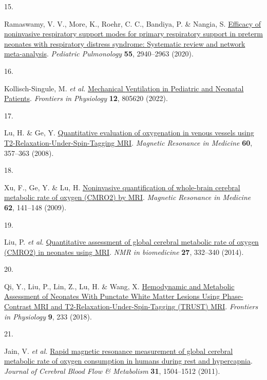 \documentclass[
  letterpaper,
  DIV=11,
  numbers=noendperiod]{scrartcl}
\newlength{\cslhangindent}
\newlength{\csllabelwidth}
\newenvironment{CSLReferences}[2] %
 {\begin{list}{}{%
  \setlength{\itemindent}{0pt}
  \setlength{\leftmargin}{0pt}
  \setlength{\parsep}{0pt}
  \ifodd #1
   \setlength{\leftmargin}{\cslhangindent}
   \setlength{\itemindent}{-1\cslhangindent}
  \fi
  \setlength{\itemsep}{#2\baselineskip}}}
 {\end{list}}
\newcommand{\CSLLeftMargin}[1]{\parbox[t]{\csllabelwidth}{\strut#1\strut}}
\newcommand{\CSLRightInline}[1]{\parbox[t]{\linewidth - \csllabelwidth}{\strut#1\strut}}
\begin{document}
\begin{CSLReferences}{0}{0}
\CSLLeftMargin{15. }%
\CSLRightInline{Ramaswamy, V. V., More, K., Roehr, C. C., Bandiya, P. \&
Nangia, S. \href{https://doi.org/10.1002/ppul.25011}{Efficacy of
noninvasive respiratory support modes for primary respiratory support in
preterm neonates with respiratory distress syndrome: {Systematic} review
and network meta-analysis}. \emph{Pediatric Pulmonology} \textbf{55},
2940--2963 (2020).}

\CSLLeftMargin{16. }%
\CSLRightInline{Kollisch-Singule, M. \emph{et al.}
\href{https://doi.org/10.3389/fphys.2021.805620}{Mechanical
{Ventilation} in {Pediatric} and {Neonatal Patients}}. \emph{Frontiers
in Physiology} \textbf{12}, 805620 (2022).}

\CSLLeftMargin{17. }%
\CSLRightInline{Lu, H. \& Ge, Y.
\href{https://doi.org/10.1002/mrm.21627}{Quantitative evaluation of
oxygenation in venous vessels using {T2-Relaxation-Under-Spin-Tagging
MRI}}. \emph{Magnetic Resonance in Medicine} \textbf{60}, 357--363
(2008).}

\CSLLeftMargin{18. }%
\CSLRightInline{Xu, F., Ge, Y. \& Lu, H.
\href{https://doi.org/10.1002/mrm.21994}{Noninvasive quantification of
whole-brain cerebral metabolic rate of oxygen ({CMRO2}) by {MRI}}.
\emph{Magnetic Resonance in Medicine} \textbf{62}, 141--148 (2009).}

\CSLLeftMargin{19. }%
\CSLRightInline{Liu, P. \emph{et al.}
\href{https://doi.org/10.1002/nbm.3067}{Quantitative assessment of
global cerebral metabolic rate of oxygen ({CMRO2}) in neonates using
{MRI}}. \emph{NMR in biomedicine} \textbf{27}, 332--340 (2014).}

\CSLLeftMargin{20. }%
\CSLRightInline{Qi, Y., Liu, P., Lin, Z., Lu, H. \& Wang, X.
\href{https://doi.org/10.3389/fphys.2018.00233}{Hemodynamic and
{Metabolic Assessment} of {Neonates With Punctate White Matter Lesions
Using Phase-Contrast MRI} and {T2-Relaxation-Under-Spin-Tagging}
({TRUST}) {MRI}}. \emph{Frontiers in Physiology} \textbf{9}, 233
(2018).}

\CSLLeftMargin{21. }%
\CSLRightInline{Jain, V. \emph{et al.}
\href{https://doi.org/10.1038/jcbfm.2011.34}{Rapid magnetic resonance
measurement of global cerebral metabolic rate of oxygen consumption in
humans during rest and hypercapnia}. \emph{Journal of Cerebral Blood
Flow \& Metabolism} \textbf{31}, 1504--1512 (2011).}


\end{CSLReferences}
\end{document}
